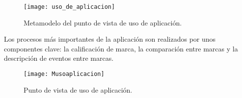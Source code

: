 \begin{figure}[H]
\centering
\texttt{[image: uso\_de\_aplicacion]}
\caption{Metamodelo del punto de vista de uso de aplicación.}
\end{figure}

Los procesos más importantes de la aplicación son realizados por unos componentes clave: la calificación de marca, la comparación entre marcas y la descripción de eventos entre marcas.

\begin{figure}[H]
\centering
\texttt{[image: Musoaplicacion]}
\caption{Punto de vista de uso de aplicación.}
\end{figure}


